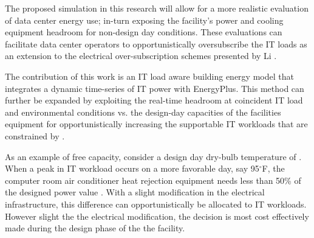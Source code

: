 The proposed simulation in this research will allow for a more realistic evaluation of data center energy use; in-turn exposing the facility's power and cooling equipment headroom for non-design day conditions. These evaluations can facilitate data center operators to opportunistically oversubscribe the IT loads as an extension to the electrical over-subscription  schemes presented by Li \citep{Li18}.  

The contribution of this work is an IT load aware building energy model that integrates a dynamic time-series of IT power with EnergyPlus. This method can further be expanded by exploiting the real-time headroom at coincident IT load and environmental conditions vs. the design-day capacities of the facilities equipment for opportunistically increasing the supportable IT workloads that are constrained by  .

As an example of free capacity, consider a design day dry-bulb temperature of . When a peak in IT workload occurs on a more favorable day, say 95$^{\circ}$F, the computer room air conditioner heat rejection equipment needs less than 50\% of the designed power value \citep{liebert20}. With a slight modification in the electrical infrastructure, this difference can opportunistically be allocated to IT workloads. However slight the the electrical modification, the decision is most cost effectively made during the design phase of the the facility.


